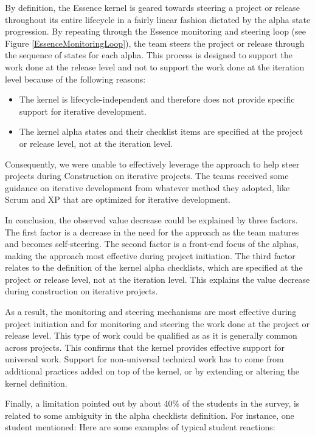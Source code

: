 By definition, the Essence kernel is geared towards steering a project or release throughout its entire lifecycle in a fairly linear fashion dictated by the alpha state progression. By repeating through the Essence monitoring and steering loop (see Figure \ref{EssenceMonitoringLoop}), the team steers the project or release through the sequence of states for each alpha. This process is designed to support the work done at the release level and not to support the work done at the iteration level because of the following reasons:

\begin{itemize}
    \item The kernel is lifecycle-independent and therefore does not provide specific support for iterative development.
    
    \item The kernel alpha states and their checklist items are specified at the project or release level, not at the iteration level.
\end{itemize}

Consequently, we were unable to effectively leverage the approach to help steer projects during Construction on iterative projects. The teams received some guidance on iterative development from whatever method they adopted, like Scrum and XP that are optimized for iterative development.

In conclusion, the observed value decrease could be explained by three factors. The first factor is a decrease in the need for the approach as the team matures and becomes self-steering. The second factor is a front-end focus of the alphas, making the approach most effective during project initiation. The third factor relates to the definition of the kernel alpha checklists, which are specified at the project or release level, not at the iteration level. This explains the value decrease during construction on iterative projects.

As a result, the monitoring and steering mechanisms are most effective during project initiation and for monitoring and steering the work done at the project or release level. This type of work could be qualified as  as it is generally common across projects. This confirms that the kernel provides effective support for universal work. Support for non-universal technical work has to come from additional practices added on top of the kernel, or by extending or altering the kernel definition.

Finally, a limitation pointed out by about 40\% of the students in the survey, is related to some ambiguity in the alpha checklists definition. For instance, one student mentioned:  Here are some examples of typical student reactions:


